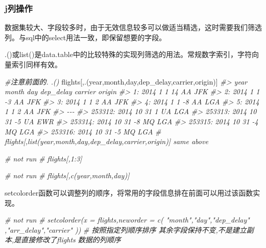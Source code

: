 \documentclass[
]{book}
\newenvironment{Shaded}{\begin{snugshade}}{\end{snugshade}}
\newcommand{\CommentTok}[1]{\textcolor[rgb]{0.56,0.35,0.01}{\textit{#1}}}
\newcommand{\NormalTok}[1]{#1}
\begin{document}
\hypertarget{jux5217ux64cdux4f5c}{%
\subsubsection{j列操作}\label{jux5217ux64cdux4f5c}}

数据集较大、字段较多时，由于无效信息较多可以做适当精选，这时需要我们筛选列。与sql中的select用法一致，即保留想要的字段。

.()或list()是data.table中的比较特殊的实现列筛选的用法。常规数字索引，字符向量索引同样有效。

\begin{Shaded}
\begin{Highlighting}[]
\CommentTok{\#注意前面的. .()}
\NormalTok{flights[,.(year,month,day,dep\_delay,carrier,origin)] }
\CommentTok{\#\textgreater{}         year month day dep\_delay carrier origin}
\CommentTok{\#\textgreater{}      1: 2014     1   1        14      AA    JFK}
\CommentTok{\#\textgreater{}      2: 2014     1   1        {-}3      AA    JFK}
\CommentTok{\#\textgreater{}      3: 2014     1   1         2      AA    JFK}
\CommentTok{\#\textgreater{}      4: 2014     1   1        {-}8      AA    LGA}
\CommentTok{\#\textgreater{}      5: 2014     1   1         2      AA    JFK}
\CommentTok{\#\textgreater{}     {-}{-}{-}                                        }
\CommentTok{\#\textgreater{} 253312: 2014    10  31         1      UA    LGA}
\CommentTok{\#\textgreater{} 253313: 2014    10  31        {-}5      UA    EWR}
\CommentTok{\#\textgreater{} 253314: 2014    10  31        {-}8      MQ    LGA}
\CommentTok{\#\textgreater{} 253315: 2014    10  31        {-}4      MQ    LGA}
\CommentTok{\#\textgreater{} 253316: 2014    10  31        {-}5      MQ    LGA}
\CommentTok{\# flights[,list(year,month,day,dep\_delay,carrier,origin)]  same above}

\CommentTok{\# not run}
\CommentTok{\# flights[,1:3]}

\CommentTok{\# not run}
\CommentTok{\# flights[,c(\textquotesingle{}year\textquotesingle{},\textquotesingle{}month\textquotesingle{},\textquotesingle{}day\textquotesingle{})]}
\end{Highlighting}
\end{Shaded}

setcolorder函数可以调整列的顺序，将常用的字段信息排在前面可以用过该函数实现。

\begin{Shaded}
\begin{Highlighting}[]
\CommentTok{\# not run}
\CommentTok{\# setcolorder(x = flights,neworder = c( "month","day","dep\_delay" ,"arr\_delay","carrier" )) }
\CommentTok{\# 按照指定列顺序排序 其余字段保持不变,不是建立副本,是直接修改了flights 数据的列顺序}
\end{Highlighting}
\end{Shaded}
\end{document}
